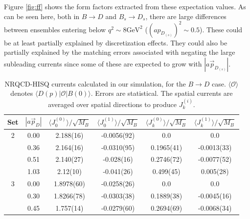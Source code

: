 \documentclass[a4paper,10pt]{article}
\numberwithin{equation}{section}
\begin{document}
Figure \ref{fig:ff} shows the form factors extracted from these expectation values. As can be seen here, both in $B\to D$ and $B_s \to D_s$, there are large differences between ensembles entering below $q^2 \sim 8\text{GeV}^2$ ($(ap_{D_{(s)}})^2 \sim 0.5$). These could be at least partially explained by discretization effects. They could also be partially explained by the matching errors associated with negating the large subleading currents since some of these are expected to grow with $\left\vert a\vec{p}_{D_{(s)}} \right\vert$.

\begin{table}
\begin{center}
\begin{tabular}{ c c c c c c }
\hline
Set & $| a\vec{p}_{D} |$ & $\langle J_0^{(0)} \rangle / \sqrt{M_{B}}$& $ \langle J_0^{(1)} \rangle / \sqrt{M_{B}}$& $\langle J_k^{(0)} \rangle / \sqrt{M_{B}}$& $\langle J_k^{(1)} \rangle / \sqrt{M_{B}}$\\ [0.5ex]
\hline
2 & 0.00 & 2.188(16) & -0.0056(92) & 0.0 & 0.0 \\ [0.5ex] 
 & 0.36 & 2.164(16) & -0.0310(95) & 0.1965(41) & -0.0013(33)\\ [0.5ex] 
 & 0.51 & 2.140(27) & -0.028(16) & 0.2746(72) & -0.0077(52)\\ [0.5ex] 
 & 1.03 & 2.12(10) & -0.041(26) & 0.499(45) & 0.005(28)\\ [0.5ex] 
 \hline
3 & 0.00 & 1.8978(60) & -0.0258(26) & 0.0 & 0.0 \\ [0.5ex] 
 & 0.30 & 1.8266(78) & -0.0303(38) & 0.1889(38) & -0.0045(16)\\ [0.5ex] 
 & 0.45 & 1.757(14) & -0.0279(60) & 0.2694(69) & -0.0068(34)\\ [0.5ex] 
\hline
\end{tabular}
\caption{NRQCD-HISQ currents calculated in our simulation, for the $B\to D$ case. $\langle \mathcal{O} \rangle$ denotes $\langle D(p) | \mathcal{O} | B(0) \rangle$. Errors are statistical. The spatial currents are averaged over spatial directions to produce $J_k^{(i)}$. \label{table:fitresults}}
\end{center}
\end{table}
\end{document}
